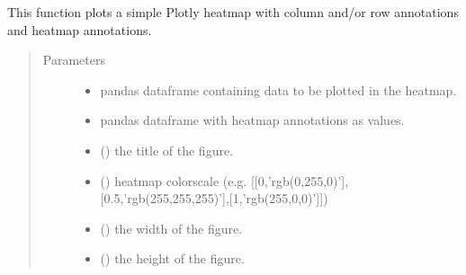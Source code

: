 \documentclass[letterpaper,10pt,english]{sphinxmanual}
\begin{document}
\begin{fulllineitems}
\label{\detokenize{_autosummary/analytics_core.viz:analytics_core.viz.wgcnaFigures.plot_labeled_heatmap}}
This function plots a simple Plotly heatmap with column and/or row annotations and heatmap annotations.
\begin{quote}\begin{description}
\item[{Parameters}] \leavevmode\begin{itemize}
\item {} 
 \textendash{} pandas dataframe containing data to be plotted in the heatmap.

\item {} 
 \textendash{} pandas dataframe with heatmap annotations as values.

\item {} 
 () \textendash{} the title of the figure.

\item {} 
 (\sphinxstyleliteralemphasis{\sphinxupquote{{[}}}\sphinxstyleliteralemphasis{\sphinxupquote{{]}}}) \textendash{} heatmap colorscale (e.g. {[}{[}0,’rgb(0,255,0)’{]},{[}0.5,’rgb(255,255,255)’{]},{[}1,’rgb(255,0,0)’{]}{]})

\item {} 
 () \textendash{} the width of the figure.

\item {} 
 () \textendash{} the height of the figure.


\end{itemize}
\end{description}
\end{quote}
\end{fulllineitems}
\end{document}
